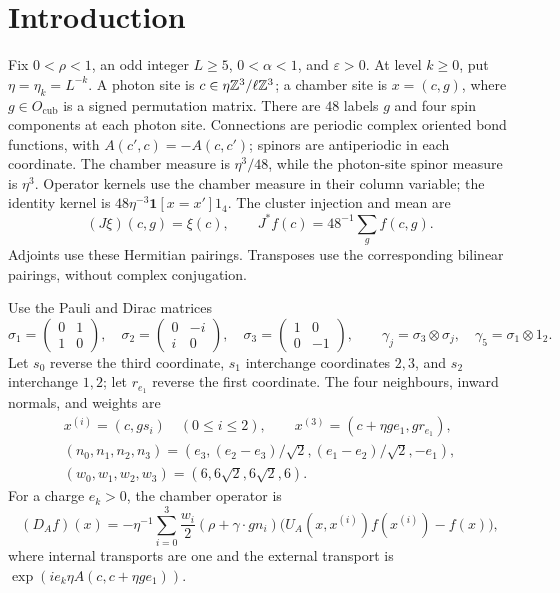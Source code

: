 \section{Introduction}\label{sec:introduction}
Fix \(0<\rho<1\), an odd integer \(L\ge5\), \(0<\alpha<1\), and
\(\varepsilon>0\). At level \(k\ge0\), put \(\eta=\eta_k=L^{-k}\).
A photon site is \(c\in\eta\mathbb Z^3/\ell\mathbb Z^3\); a chamber site is
\(x=(c,g)\), where \(g\in O_{\mathrm{cub}}\) is a signed permutation
matrix. There are \(48\) labels \(g\) and four spin components at
each photon site. Connections are periodic complex oriented bond
functions, with \(A(c',c)=-A(c,c')\); spinors are antiperiodic in
each coordinate. The chamber measure is \(\eta^3/48\), while the
photon-site spinor measure is \(\eta^3\).
Operator kernels use the chamber measure in their column variable;
the identity kernel is \(48\eta^{-3}\mathbf1[x=x']1_4\).
The cluster injection and mean are
\[
 (J\xi)(c,g)=\xi(c),\qquad J^*f(c)=48^{-1}\sum_g f(c,g).
\]
Adjoints use these Hermitian pairings. Transposes use the corresponding
bilinear pairings, without complex conjugation.

Use the Pauli and Dirac matrices
\[
 \sigma_1=\begin{pmatrix}0&1\\1&0\end{pmatrix},\quad
 \sigma_2=\begin{pmatrix}0&-i\\i&0\end{pmatrix},\quad
 \sigma_3=\begin{pmatrix}1&0\\0&-1\end{pmatrix},\qquad
 \gamma_j=\sigma_3\otimes\sigma_j,\quad
 \gamma_5=\sigma_1\otimes1_2.
\]
Let \(s_0\) reverse the third coordinate, \(s_1\) interchange
coordinates \(2,3\), and \(s_2\) interchange \(1,2\); let \(r_{e_1}\)
reverse the first coordinate. The four neighbours, inward normals,
and weights are
\[
 \begin{gathered}
 x^{(i)}=(c,gs_i)\quad(0\le i\le2),\qquad
 x^{(3)}=(c+\eta ge_1,gr_{e_1}),\\
 (n_0,n_1,n_2,n_3)
   =(e_3,(e_2-e_3)/\sqrt2,(e_1-e_2)/\sqrt2,-e_1),\\
 (w_0,w_1,w_2,w_3)=(6,6\sqrt2,6\sqrt2,6).
 \end{gathered}
\]
For a charge \(e_k>0\), the chamber operator is
\begin{equation}\label{eq:intro-chamber-operator}
 (D_Af)(x)=-\eta^{-1}\sum_{i=0}^3
       \frac{w_i}{2}(\rho+\gamma\cdot gn_i)
       \bigl(U_A(x,x^{(i)})f(x^{(i)})-f(x)\bigr),
\end{equation}
where internal transports are one and the external transport is
\(\exp(ie_k\eta A(c,c+\eta ge_1))\).

